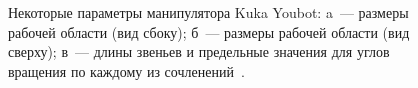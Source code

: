 \begin{figure}[p]
	\vfill
	\begin{minipage}[h]{0.47\linewidth}
	\end{minipage}
	\hfill
	\begin{minipage}[h]{0.47\linewidth}
	\end{minipage}
	\caption{Некоторые параметры манипулятора Kuka Youbot: a~--- размеры рабочей области (вид сбоку); б~--- размеры рабочей области (вид сверху); в~--- длины звеньев и предельные значения для углов вращения по каждому из сочленений~\cite{youbot_detailed_specifications}.}
	\label{img:sizes_of_robot}
\end{figure}

\newpage